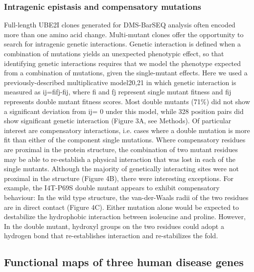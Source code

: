 \subsubsection{Intragenic epistasis and compensatory mutations}

Full-length UBE2I clones generated for DMS-BarSEQ analysis often encoded more than one amino acid change. Multi-mutant clones offer the opportunity to search for intragenic genetic interactions. Genetic interaction is defined when a combination of mutations yields an unexpected phenotypic effect, so that identifying genetic interactions requires that we model the phenotype expected from a combination of mutations, given the single-mutant effects.  Here we used a previously-described multiplicative model20,21 in which genetic interaction is measured as ij=fifj-fij, where fi and fj represent single mutant fitness and fij represents double mutant fitness scores. Most double mutants (71\%) did not show a significant deviation from ij= 0 under this model, while 328 position pairs did show significant genetic interaction (Figure 3A, see Methods). Of particular interest are compensatory interactions, i.e. cases where a double mutation is more fit than either of the component single mutations.  Where compensatory residues are proximal in the protein structure, the combination of two mutant residues may be able to re-establish a physical interaction that was lost in each of the single mutants. Although the majority of genetically interacting sites were not proximal in the structure (Figure 4B), there were interesting exceptions. For example, the I4T-P69S double mutant appears to exhibit compensatory behaviour: In the wild type structure, the van-der-Waals radii of the two residues are in direct contact (Figure 4C). Either mutation alone would be expected to destabilize the hydrophobic interaction between isoleucine and proline.  However, In the double mutant, hydroxyl groups on the two residues could adopt a hydrogen bond that re-establishes interaction and re-stabilizes the fold. 


\subsection{Functional maps of three human disease genes}

